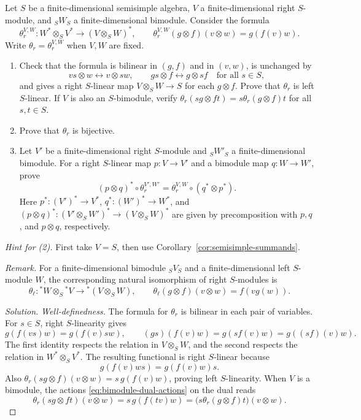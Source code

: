 \begin{advanced}
\begin{exercise}\label{ex:tensor-duality-proof}
Let $S$ be a finite-dimensional semisimple algebra, $V$ a finite-dimensional right $S$-module, and ${}_SW_S$ a finite-dimensional bimodule.
Consider the formula
\[
\theta_r^{V,W}:W^*\otimes_S V^*\longrightarrow(V\otimes_S W)^*,
\qquad \theta_r^{V,W}(g\otimes f)(v\otimes w)=g(f(v)w).
\]
Write $\theta_r=\theta_r^{V,W}$ when $V,W$ are fixed.
\begin{enumerate}
\item Check that the formula is bilinear in $(g,f)$ and in $(v,w)$, is unchanged by
\[
vs\otimes w\longleftrightarrow v\otimes sw,
\qquad gs\otimes f\longleftrightarrow g\otimes sf
\quad\text{for all }s\in S,
\]
and gives a right $S$-linear map $V\otimes_S W\to S$ for each $g\otimes f$.
Prove that $\theta_r$ is left $S$-linear.
If $V$ is also an $S$-bimodule, verify $\theta_r(sg\otimes ft)=s\theta_r(g\otimes f)t$ for all $s,t\in S$.
\item Prove that $\theta_r$ is bijective.
\item Let $V'$ be a finite-dimensional right $S$-module and ${}_SW'_S$ a finite-dimensional bimodule.
For a right $S$-linear map $p:V\to V'$ and a bimodule map $q:W\to W'$, prove
\[
(p\otimes q)^*\circ\theta_r^{V',W'}
=\theta_r^{V,W}\circ(q^*\otimes p^*).
\]
Here $p^*:(V')^*\to V^*$, $q^*:(W')^*\to W^*$, and $(p\otimes q)^*:(V'\otimes_S W')^*\to(V\otimes_S W)^*$ are given by precomposition with $p,q$, and $p\otimes q$, respectively.
\end{enumerate}
\emph{Hint for (2).} First take $V=S$, then use Corollary~\ref{cor:semisimple-summands}.

\emph{Remark.} For a finite-dimensional bimodule ${}_SV_S$ and a finite-dimensional left $S$-module $W$, the corresponding natural isomorphism of right $S$-modules is
\[
\theta_\ell:{}^*W\otimes_S{}^*V\longrightarrow{}^*(V\otimes_S W),
\qquad \theta_\ell(g\otimes f)(v\otimes w)=f(vg(w)).
\]
\end{exercise}

\begin{hidden}
\begin{proof}[Solution]
\emph{Well-definedness.}
The formula for $\theta_r$ is bilinear in each pair of variables.
For $s\in S$, right $S$-linearity gives
\[
g(f(vs)w)=g(f(v)sw),\qquad
(gs)(f(v)w)=g(sf(v)w)=g((sf)(v)w).
\]
The first identity respects the relation in $V\otimes_S W$, and the second respects the relation in $W^*\otimes_S V^*$.
The resulting functional is right $S$-linear because
\[
g(f(v)ws)=g(f(v)w)s.
\]
Also $\theta_r(sg\otimes f)(v\otimes w)=s\,g(f(v)w)$, proving left $S$-linearity.
When $V$ is a bimodule, the actions  \eqref{eq:bimodule-dual-actions} on the dual reads
\[
\theta_r(sg\otimes ft)(v\otimes w)
=s\,g(f(tv)w)
=\bigl(s\theta_r(g\otimes f)t\bigr)(v\otimes w).
\]


\end{proof}
\end{hidden}
\end{advanced}
